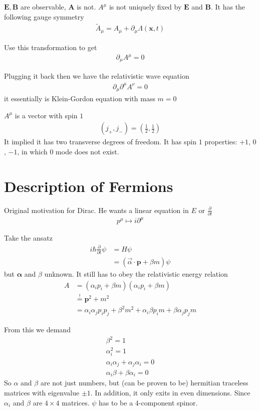 $\pmb{E}, \pmb{B}$ are observable, $\pmb{A}$ is not. $A^\mu$ is not uniquely fixed by $\pmb{E}$ and $\pmb{B}$. It has the following gauge symmetry
\begin{align}
   \tilde{A}_{\mu} = A_\mu + \partial_\mu \Lambda(\pmb{x}, t)
\end{align}

Use this transformation to get
\begin{align}
   \partial_\mu A^\mu = 0
\end{align}

Plugging it back then we have the relativistic wave equation
\begin{align}
   \partial_\mu \partial^\mu A^\nu = 0
\end{align}
it essentially is Klein-Gordon equation with mass $m=0$

$A^\mu$ is a vector with spin $1$
\begin{align*}
   (j_+, j_-) = \left( \frac{1}{2}, \frac{1}{2} \right)
\end{align*}
It implied it has two transverse degrees of freedom. It has spin $1$ properties: $+1$, $0$, $-1$, in which $0$ mode does not exist.

\section{Description of Fermions}
Original motivation for Dirac. He wants a linear equation in $E$ or $\frac{\partial}{\partial t}$
\begin{align*}
   p^\mu \mapsto i\partial^\mu
\end{align*}

Take the ansatz
\begin{align*}
   i\hbar \frac{\partial}{\partial t}\psi &= H \psi \\
   &= (\vec{\alpha}\cdot \pmb{p} + \beta m ) \psi
\end{align*}
but $\pmb{\alpha}$ and $\beta$ unknown. It still has to obey the relativistic energy relation
\begin{align*}
   A &= \left( \alpha_ip_i + \beta m \right) \left( \alpha_ip_i + \beta m \right) \\
     &\stackrel{!}{=} \pmb{p}^2 + m^2 \\
     &= \alpha_i \alpha_j p_i p_j + \beta^2m^2 + \alpha_i \beta p_i m + \beta \alpha_j p_j m
\end{align*}

From this we demand
\begin{align}
   \beta^2 = 1 \\
   \alpha_i^2 = 1 \\
   \alpha_i \alpha_j + \alpha_j \alpha_i = 0 \\
   \alpha_i \beta + \beta \alpha_i = 0
\end{align}
So $\alpha$ and $\beta$ are not just numbers, but (can be proven to be) hermitian traceless matrices with eigenvalue $\pm 1$.  In addition, it only exits in even dimensions.
Since $\alpha_i$ and $\beta$ are $4\times4$ matrices. $\psi$ has to be a 4-component spinor.

